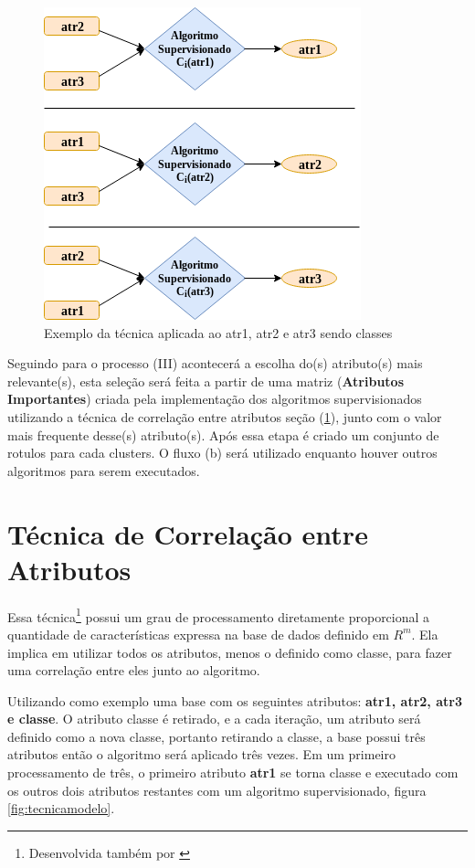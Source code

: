 \begin{figure}[h!]
        \centering
        \includegraphics[scale=0.7]{figs/tecnicamodeloComp.png}
        \caption{Exemplo da técnica aplicada ao atr1, atr2 e atr3 sendo classes } \label{fig:tecnicamodelocomp}
\end{figure}

Seguindo para o processo (III) acontecerá a escolha do(s) atributo(s) mais relevante(s), esta seleção será feita a partir de uma matriz (\textbf{Atributos Importantes}) criada pela implementação dos algoritmos supervisionados utilizando a técnica de correlação entre atributos seção (\ref{cap:ferramentas:sec:tecnica}), junto com o valor mais frequente desse(s) atributo(s). Após essa etapa é criado um conjunto de rotulos para cada clusters. O fluxo (b) será utilizado enquanto houver outros algoritmos para serem executados.

\section{Técnica de Correlação entre Atributos }\label{cap:ferramentas:sec:tecnica}

Essa técnica\footnote{Desenvolvida também por \cite{LOPES2014}} possui um grau de processamento diretamente proporcional a quantidade de características expressa na base de dados definido em ${R^m}$. Ela implica em utilizar todos os atributos, menos o definido como classe, para fazer uma correlação entre eles junto ao algoritmo.


Utilizando como exemplo uma base com os seguintes atributos: \textbf{atr1, atr2, atr3 e classe}. O atributo classe é retirado, e a cada iteração, um atributo será definido como a nova classe, portanto retirando a classe, a base possui três atributos então o algoritmo será aplicado três vezes. Em um primeiro processamento de três, o primeiro atributo \textbf{atr1} se torna classe e executado com os outros dois atributos restantes com um algoritmo supervisionado, figura \ref{fig:tecnicamodelo}.

